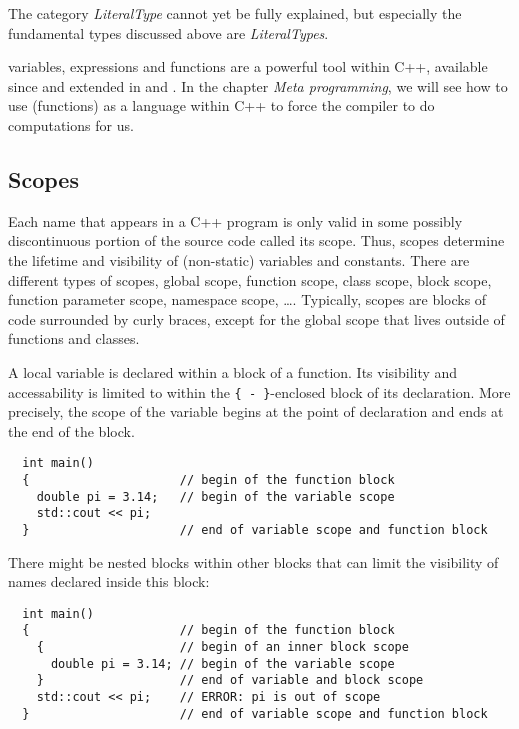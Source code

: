 The category \emph{LiteralType} cannot yet be fully explained, but especially the fundamental types discussed above are \emph{LiteralTypes}.

\begin{rem}
   variables, expressions and functions are a powerful tool within C++, available since  and extended in  and . In the chapter \emph{Meta programming}, we will see how to use  (functions) as a language within C++ to force the compiler to do computations for us.
\end{rem}


\subsection{Scopes}
Each name that appears in a C++ program is only valid in some possibly discontinuous portion of the source code called its scope. Thus, scopes determine the lifetime and visibility of (non-static) variables and constants. There are different types of scopes, global scope, function scope, class scope, block scope, function parameter scope, namespace scope, \dots. Typically, scopes are blocks of code surrounded by curly braces, except for the global scope that lives outside of functions and classes.

A local variable is declared within a block of a function. Its visibility and accessability is limited to within the \texttt{\{ - \}}-enclosed block of its declaration. More precisely, the scope of the variable begins at the point of declaration and ends at the end of the block.
\begin{verbatim}
  int main()
  {                     // begin of the function block
    double pi = 3.14;   // begin of the variable scope
    std::cout << pi;
  }                     // end of variable scope and function block
\end{verbatim}

There might be nested blocks within other blocks that can limit the visibility of names declared inside this block:
\begin{verbatim}
  int main()
  {                     // begin of the function block
    {                   // begin of an inner block scope
      double pi = 3.14; // begin of the variable scope
    }                   // end of variable and block scope
    std::cout << pi;    // ERROR: pi is out of scope
  }                     // end of variable scope and function block
\end{verbatim}

